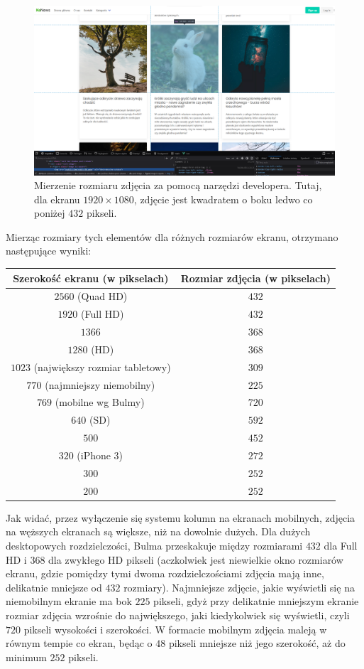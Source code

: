 \documentclass[licencjacka]{pracadypl}
\begin{document}
\begin{figure}[H]
  \includegraphics[width=\linewidth]{images/screenshot-devtools-1080width.png}
  \caption{Mierzenie rozmiaru zdjęcia za pomocą narzędzi developera. Tutaj, dla ekranu $1920\times1080$, zdjęcie jest kwadratem o boku ledwo co poniżej $432$ pikseli.}
  \label{fig:screenshot-measuring}
\end{figure}

Mierząc rozmiary tych elementów dla różnych rozmiarów ekranu, otrzymano następujące wyniki:

\begin{center}
  \begin{tabular}{|c|c|}
    \hline
    Szerokość ekranu (w pikselach) & Rozmiar zdjęcia (w pikselach) \\
    \hline
    $2560$ (Quad HD) & $432$ \\
    $1920$ (Full HD) & $432$ \\
    $1366$ & $368$ \\
    $1280$ (HD) & $368$ \\
    $1023$ (największy rozmiar tabletowy) & $309$ \\
    $770$ (najmniejszy niemobilny) & $225$ \\
    $769$ (mobilne wg Bulmy) & $720$ \\
    $640$ (SD) & $592$ \\
    $500$ & $452$ \\
    $320$ (iPhone 3) & $272$ \\
    $300$ & $252$ \\
    $200$ & $252$ \\
    \hline
  \end{tabular}
\end{center}

Jak widać, przez wyłączenie się systemu kolumn na ekranach mobilnych, zdjęcia na węższych ekranach są większe, niż na dowolnie dużych. Dla dużych desktopowych rozdzielczości, Bulma przeskakuje między rozmiarami $432$ dla Full HD i $368$ dla zwykłego HD pikseli (aczkolwiek jest niewielkie okno rozmiarów ekranu, gdzie pomiędzy tymi dwoma rozdzielczościami zdjęcia mają inne, delikatnie mniejsze od $432$ rozmiary). Najmniejsze zdjęcie, jakie wyświetli się na niemobilnym ekranie ma bok $225$ pikseli, gdyż przy delikatnie mniejszym ekranie rozmiar zdjęcia wzrośnie do największego, jaki kiedykolwiek się wyświetli, czyli $720$ pikseli wysokości i szerokości. W formacie mobilnym zdjęcia maleją w równym tempie co ekran, będąc o $48$ pikseli mniejsze niż jego szerokość, aż do minimum $252$ pikseli.
\end{document}
